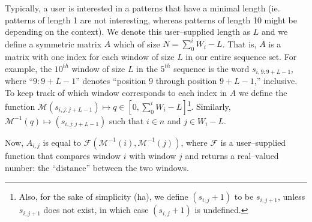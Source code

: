 	Typically, a user is interested in a patterns that have a minimal length
	(ie. patterns of length 1 are not interesting, whereas patterns of length
	10 might be depending on the context).  We denote this user--supplied
	length as $L$ and we define a symmetric matrix $A$ which of size $N =
	\sum_{0}^{i}W_i-L$.  That is, $A$ is a matrix with one index for each
	window of size $L$ in our entire sequence set.  For example, the $10^{th}$
	window of size $L$ in the $5^{th}$ sequence is the word $s_{i,9:9+L-1}$,
	where ``$9:9+L-1$'' denotes ``position $9$ through position $9+L-1$,''
	inclusive.  To keep track of which window corresponds to each index in
	$A$ we define the function $\mathscr{M}(s_{i,j:j+L-1})\mapsto q \in
	[0, \sum_{0}^{i}W_i-L]$\footnote{Also, for the sake of simplicity (ha),
	we define $(s_{i,j}+1)$ to be $s_{i,j+1}$, unless $s_{i,j+1}$ does not 
	exist, in which case $(s_{i,j}+1)$ is undefined.}.  Similarly, $\mathscr{M}^{-1}(q) \mapsto
	(s_{i,j:j+L-1})$ such that $i\in n$ and $j \in W_i-L$.

	Now, $A_{i,j}$ is equal to $\mathscr{F}(\mathscr{M}^{-1}(i), \mathscr{M}^{-1}(j))$,
	where $\mathscr{F}$ is a user--supplied function that compares window $i$ with 
	window $j$ and returns a real--valued number: the ``distance'' between the two
	windows.

